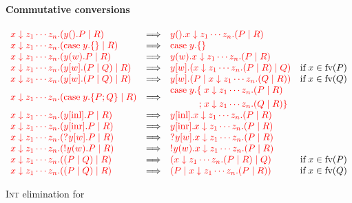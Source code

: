 \begin{figure*}
  \paragraph*{Commutative conversions}
  \(
  \begin{array}{lclr}
    \red{ \intl{x}{z_1 \cdots z_n}(\wait{y}P \mid R) }
    &\Longrightarrow&
    \red{ \wait{y}\intl{x}{z_1 \cdots z_n}(P \mid R) }
    \\
    \red{ \intl{x}{z_1\cdots z_n}(\case{y}{}{} \mid R) }
    &\Longrightarrow&
    \red{ \case{y}{}{} }
    \\
    \red{ \intl{x}{z_1 \cdots z_n}(\recv{y}{w}P \mid R) }
    &\Longrightarrow&
    \red{ \recv{y}{w}\intl{x}{z_1 \cdots z_n}(P \mid R) }
    \\
    \red{ \intl{x}{z_1 \cdots z_n}(\send{y}{w}(P \mid Q) \mid R) }
    &\Longrightarrow&        
    \red{ \send{y}{w}(\intl{x}{z_1 \cdots z_n}(P \mid R) \mid Q) }
    &\text{if} \; x \in \text{fv}(P)
    \\
    \red{ \intl{x}{z_1 \cdots z_n}(\send{y}{w}(P \mid Q) \mid R) }
    &\Longrightarrow&        
    \red{ \send{y}{w}(P \mid \intl{x}{z_1 \cdots z_n}(Q \mid R)) }
    &\text{if} \; x \in \text{fv}(Q)
    \\
    \red{ \intl{x}{z_1 \cdots z_n}(\case{y}{P}{Q} \mid R) }
    &\Longrightarrow&
    \!\begin{aligned}
      \red{ \text{case}\;y.}
      \red{ \{\;}& \red{ \intl{x}{z_1 \cdots z_n}(P \mid R) } \\
      \red{  ;\;}& \red{ \intl{x}{z_1 \cdots z_n}(Q \mid R) \}}
    \end{aligned}
    \\
    \red{ \intl{x}{z_1 \cdots z_n}(\inl{y}P \mid R) }
    &\Longrightarrow&
    \red{ \inl{y}\intl{x}{z_1 \cdots z_n}(P \mid R) }      
    \\
    \red{ \intl{x}{z_1 \cdots z_n}(\inr{y}P \mid R) }
    &\Longrightarrow&
    \red{ \inr{y}\intl{x}{z_1 \cdots z_n}(P \mid R) }      
    \\
    \red{ \intl{x}{z_1 \cdots z_n}(\give{\send{y}{w}}P \mid R) }
    &\Longrightarrow&
    \red{ \give{\send{y}{w}}\intl{x}{z_1 \cdots z_n}(P \mid R) }
    \\ 
    \red{ \intl{x}{z_1 \cdots z_n}(\take{\recv{y}{w}}P \mid R) }
    &\Longrightarrow&
    \red{ \take{\recv{y}{w}}\intl{x}{z_1 \cdots z_n}(P \mid R) }
    \\ 
    \red{ \intl{x}{z_1 \cdots z_n}((P \mid Q) \mid R) }
    &\Longrightarrow&
    \red{ (\intl{x}{z_1 \cdots z_n}(P \mid R) \mid Q) } 
    &\text{if} \; x \in \text{fv}(P)
    \\ 
    \red{ \intl{x}{z_1 \cdots z_n}((P \mid Q) \mid R) }
    &\Longrightarrow&
    \red{ (P \mid \intl{x}{z_1 \cdots z_n}(P \mid R)) } 
    &\text{if} \; x \in \text{fv}(Q)
  \end{array}
  \)   
  \caption{\textsc{Int} elimination for \nodcap}
  \label{fig:nodcap-intl}
\end{figure*}

